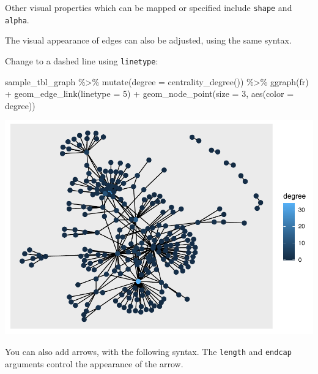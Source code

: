 \documentclass[
]{book}
\newenvironment{Shaded}{\begin{snugshade}}{\end{snugshade}}
\newcommand{\AttributeTok}[1]{\textcolor[rgb]{0.77,0.63,0.00}{#1}}
\newcommand{\DecValTok}[1]{\textcolor[rgb]{0.00,0.00,0.81}{#1}}
\newcommand{\FunctionTok}[1]{\textcolor[rgb]{0.00,0.00,0.00}{#1}}
\newcommand{\NormalTok}[1]{#1}
\newcommand{\SpecialCharTok}[1]{\textcolor[rgb]{0.00,0.00,0.00}{#1}}
\newcommand{\StringTok}[1]{\textcolor[rgb]{0.31,0.60,0.02}{#1}}
\begin{document}
Other visual properties which can be mapped or specified include \texttt{shape} and \texttt{alpha}.

The visual appearance of edges can also be adjusted, using the same syntax.

Change to a dashed line using \texttt{linetype}:

\begin{Shaded}
\begin{Highlighting}[]
\NormalTok{sample\_tbl\_graph }\SpecialCharTok{\%\textgreater{}\%} 
  \FunctionTok{mutate}\NormalTok{(}\AttributeTok{degree =} \FunctionTok{centrality\_degree}\NormalTok{()) }\SpecialCharTok{\%\textgreater{}\%} 
  \FunctionTok{ggraph}\NormalTok{(}\StringTok{\textquotesingle{}fr\textquotesingle{}}\NormalTok{) }\SpecialCharTok{+} 
  \FunctionTok{geom\_edge\_link}\NormalTok{(}\AttributeTok{linetype =} \DecValTok{5}\NormalTok{) }\SpecialCharTok{+} 
  \FunctionTok{geom\_node\_point}\NormalTok{(}\AttributeTok{size =} \DecValTok{3}\NormalTok{, }\FunctionTok{aes}\NormalTok{(}\AttributeTok{color =}\NormalTok{ degree))}
\end{Highlighting}
\end{Shaded}

\includegraphics{_main_files/figure-latex/unnamed-chunk-61-1.pdf}

You can also add arrows, with the following syntax. The \texttt{length} and \texttt{endcap} arguments control the appearance of the arrow.
\end{document}
